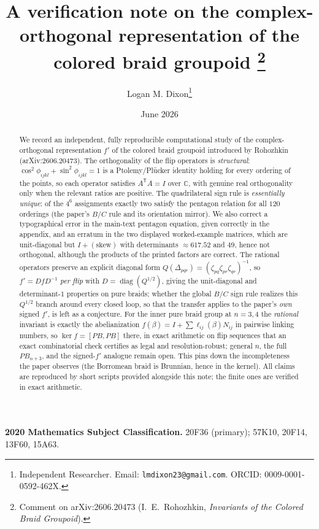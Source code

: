 \documentclass[11pt]{article}
\title{A verification note on the complex-orthogonal representation of the colored braid groupoid%
\thanks{Comment on arXiv:2606.20473 (I.~E.~Rohozhkin, \emph{Invariants of the Colored Braid Groupoid}).}}
\author{Logan M. Dixon\thanks{Independent Researcher. Email:
\texttt{lmdixon23@gmail.com}. ORCID: 0009-0001-0592-462X.}}
\date{June 2026}
\theoremstyle{plain}
\theoremstyle{definition}
\theoremstyle{remark}
\newcommand{\C}{\mathbb{C}}
\begin{document}
\maketitle

\begin{abstract}
We record an independent, fully reproducible computational study of the complex-orthogonal
representation $f'$ of the colored braid groupoid introduced by Rohozhkin \cite{rohozhkin2026}
(arXiv:2606.20473). The orthogonality of the flip operators is \emph{structural}:
$\cos^2\phi_{ijkl}+\sin^2\phi_{ijkl}=1$ is a Ptolemy/Pl\"ucker identity holding for every ordering of
the points, so each operator satisfies $A^{\mathsf T}A=I$ over $\C$, with genuine real orthogonality
only when the relevant ratios are positive. The quadrilateral sign rule is \emph{essentially unique}: of the $4^{6}$ assignments exactly two satisfy the pentagon relation for all $120$ orderings (the
paper's $B/C$ rule and its orientation mirror). We also correct a typographical error in the main-text
pentagon equation, given correctly in the appendix, and an erratum in the two displayed worked-example
matrices, which are unit-diagonal but $I+(\text{skew})$ with determinants $\approx 617.52$ and $49$,
hence not orthogonal, although the products of the printed factors are correct. The rational operators
preserve an explicit diagonal form $Q(\Delta_{pqr})=(\zeta_{pq}\zeta_{pr}\zeta_{qr})^{-1}$, so
$f'=DfD^{-1}$ \emph{per flip} with $D=\operatorname{diag}(Q^{1/2})$, giving the unit-diagonal and
determinant-$1$ properties on pure braids; whether the global $B/C$ sign rule realizes this $Q^{1/2}$
branch around every closed loop, so that the transfer applies to the paper's \emph{own} signed $f'$, is
left as a conjecture. For the inner pure braid group at $n=3,4$ the \emph{rational} invariant is exactly
the abelianization $f(\beta)=I+\sum\ell_{ij}(\beta)N_{ij}$ in pairwise linking numbers, so
$\ker f=[PB,PB]$ there, in exact arithmetic on flip sequences that an exact combinatorial check
certifies as legal and resolution-robust; general $n$, the full $PB_{n+3}$, and the signed-$f'$ analogue
remain open. This pins down the incompleteness the paper observes (the Borromean braid is Brunnian,
hence in the kernel). All claims are reproduced by short scripts provided alongside this note; the finite
ones are verified in exact arithmetic.
\end{abstract}

\medskip
\noindent\textbf{2020 Mathematics Subject Classification.} 20F36 (primary); 57K10, 20F14, 13F60, 15A63.
\end{document}
